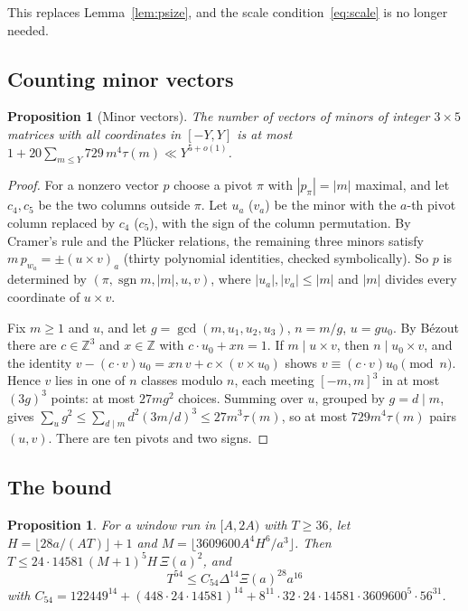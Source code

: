 \documentclass[11pt]{amsart}
\newtheorem{proposition}[theorem]{Proposition}
\theoremstyle{definition}
\theoremstyle{remark}
\begin{document}
This replaces Lemma~\ref{lem:psize}, and the scale condition~\eqref{eq:scale} is no longer
needed.

\subsection{Counting minor vectors}

\begin{proposition}[Minor vectors]\label{prop:minorvec}
The number of vectors of minors of integer $3\times5$ matrices with all coordinates in $[-Y,Y]$ is
at most $1+20\sum_{m\le Y}729\,m^4\tau(m)\ll Y^{5+o(1)}$.
\end{proposition}

\begin{proof}
For a nonzero vector $p$ choose a pivot $\pi$ with $|p_\pi|=|m|$ maximal, and let $c_4,c_5$ be
the two columns outside $\pi$. Let $u_a$ ($v_a$) be the minor with the $a$-th pivot column replaced
by $c_4$ ($c_5$), with the sign of the column permutation. By Cramer's rule and the Pl\"ucker
relations, the remaining three minors satisfy $m\,p_{w_a}=\pm(u\times v)_a$ (thirty polynomial
identities, checked symbolically). So $p$ is determined by $(\pi,\operatorname{sgn}m,|m|,u,v)$,
where $|u_a|,|v_a|\le|m|$ and $|m|$ divides every coordinate of $u\times v$.

Fix $m\ge1$ and $u$, and let $g=\gcd(m,u_1,u_2,u_3)$, $n=m/g$, $u=gu_0$. By B\'ezout there are
$c\in\mathbb Z^3$ and $x\in\mathbb Z$ with $c\cdot u_0+xn=1$. If $m\mid u\times v$, then
$n\mid u_0\times v$, and the identity
$v-(c\cdot v)u_0=xn\,v+c\times(v\times u_0)$ shows $v\equiv(c\cdot v)u_0\pmod n$. Hence $v$ lies
in one of $n$ classes modulo $n$, each meeting $[-m,m]^3$ in at most $(3g)^3$ points: at most
$27mg^2$ choices. Summing over $u$, grouped by $g=d\mid m$, gives
$\sum_u g^2\le\sum_{d\mid m}d^2(3m/d)^3\le27m^3\tau(m)$, so at most $729m^4\tau(m)$ pairs
$(u,v)$. There are ten pivots and two signs.
\end{proof}

\subsection{The bound}

\begin{proposition}\label{prop:twostate3}
For a window run in $[A,2A)$ with $T\ge36$, let $H=\lfloor28a/(AT)\rfloor+1$ and
$M=\lfloor3609600A^4H^6/a^3\rfloor$. Then $T\le24\cdot14581\,(M+1)^5H\,\Xi(a)^2$, and
\[
T^{54}\le C_{54}\Delta^{14}\Xi(a)^{28}a^{16}
\]
with $C_{54}=122449^{14}+(448\cdot24\cdot14581)^{14}+8^{11}\cdot32\cdot24\cdot14581\cdot3609600^5\cdot56^{31}$.
\end{proposition}
\end{document}
